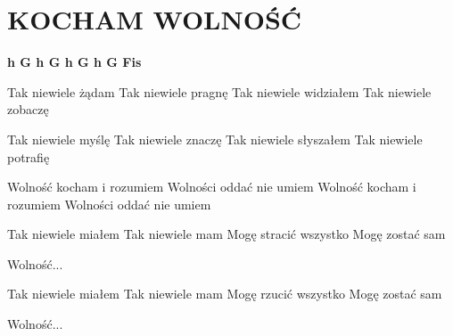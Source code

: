 \documentclass[../../../songbook.tex]{subfiles}
\begin{document}
\TabPositions{7cm} %
\section*{KOCHAM WOLNOŚĆ}
{}
\vspace{0.5cm}

 {\color{red}\textbf{h G h G h G h G Fis} } \newline

Tak niewiele żądam		 \newline
Tak niewiele pragnę		 \newline
Tak niewiele widziałem	 \newline
Tak niewiele zobaczę	 \newline

Tak niewiele myślę			 \newline
Tak niewiele znaczę			 \newline
Tak niewiele słyszałem			 \newline
Tak niewiele potrafię			 \newline

\-\hspace{1cm} Wolność kocham i rozumiem		 \newline
\-\hspace{1cm} Wolności oddać nie umiem		 \newline
\-\hspace{1cm} Wolność kocham i rozumiem		 \newline
\-\hspace{1cm} Wolności oddać nie umiem		 \newline

Tak niewiele miałem			 \newline
Tak niewiele mam			 \newline
Mogę stracić wszystko			 \newline
Mogę zostać sam			 \newline

\-\hspace{1cm} Wolność...			 \newline

Tak niewiele miałem			 \newline
Tak niewiele mam			 \newline
Mogę rzucić wszystko			 \newline
Mogę zostać sam			 \newline

\-\hspace{1cm} Wolność...
\end{document}
